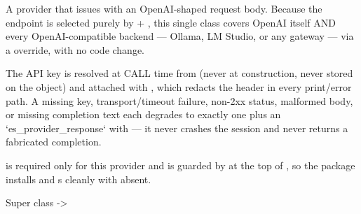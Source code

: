\documentclass[a4paper]{book}
\begin{document}
%
\begin{Description}
A provider that issues 
with an OpenAI-shaped request body. Because the endpoint is selected purely
by  + , this single class covers OpenAI itself
AND every OpenAI-compatible backend — Ollama, LM Studio, or any gateway —
via a  override, with no code change.

The API key is resolved at CALL time from  (never at
construction, never stored on the object) and attached with
, which redacts the 
header in every print/error path. A missing key, transport/timeout failure,
non-2xx status, malformed body, or missing completion text each degrades to
exactly one  plus an `es\_provider\_response` with
 — it never crashes the session and never returns
a fabricated completion.

 is required only for this provider and is guarded by
 at the top of , so the package
installs and s cleanly with  absent.
\end{Description}
%
\begin{Section}{Super class}
 -> 
\end{Section}
%
\end{document}
